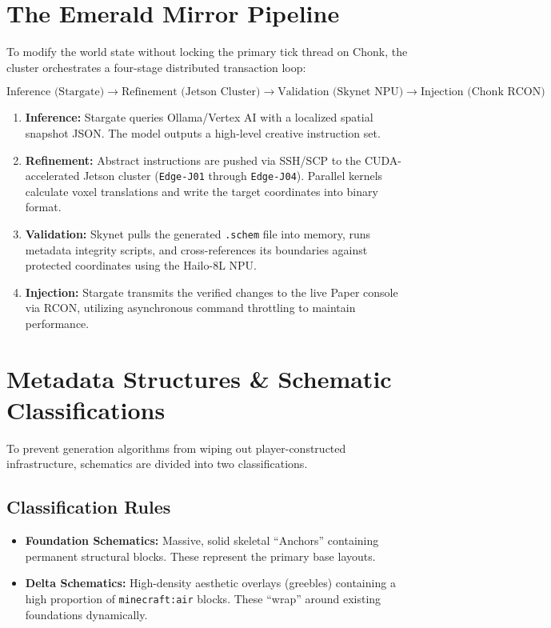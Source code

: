 \section{The Emerald Mirror Pipeline}
To modify the world state without locking the primary tick thread on Chonk, the cluster orchestrates a four-stage distributed transaction loop:

\begin{equation}
    \text{Inference (Stargate)} \rightarrow \text{Refinement (Jetson Cluster)} \rightarrow \text{Validation (Skynet NPU)} \rightarrow \text{Injection (Chonk RCON)}
\end{equation}

\begin{enumerate}
    \item \textbf{Inference:} Stargate queries Ollama/Vertex AI with a localized spatial snapshot JSON. The model outputs a high-level creative instruction set.
    \item \textbf{Refinement:} Abstract instructions are pushed via SSH/SCP to the CUDA-accelerated Jetson cluster (\texttt{Edge-J01} through \texttt{Edge-J04}). Parallel kernels calculate voxel translations and write the target coordinates into binary format.
    \item \textbf{Validation:} Skynet pulls the generated \texttt{.schem} file into memory, runs metadata integrity scripts, and cross-references its boundaries against protected coordinates using the Hailo-8L NPU.\@
    \item \textbf{Injection:} Stargate transmits the verified changes to the live Paper console via RCON, utilizing asynchronous command throttling to maintain performance.
\end{enumerate}

\section{Metadata Structures \& Schematic Classifications}
To prevent generation algorithms from wiping out player-constructed infrastructure, schematics are divided into two classifications.

\subsection{Classification Rules}
\begin{itemize}
    \item \textbf{Foundation Schematics:} Massive, solid skeletal ``Anchors'' containing permanent structural blocks. These represent the primary base layouts.
    \item \textbf{Delta Schematics:} High-density aesthetic overlays (greebles) containing a high proportion of \texttt{minecraft:air} blocks. These ``wrap'' around existing foundations dynamically.
\end{itemize}

